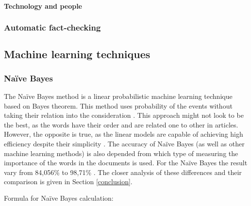 \documentclass[11pt ,english,a4paper]{article}
\begin{document}
\paragraph{Technology and people}%

\subsubsection{Automatic fact-checking}\label{tech:fact:auto}
\cite{gu22fact}

\subsection{Machine learning techniques} \label{tech:mach}



\subsubsection{Naïve Bayes}\label{nb}
The Naïve Bayes method is a linear probabilistic machine learning technique based on Bayes theorem. This method uses probability of the events without taking their relation into the consideration \cite{sha20mach}. This approach might not look to be the best, as the words have their order and are related one to other in articles. However, the opposite is true, as the linear models are capable of achieving high efficiency despite their simplicity \cite{pod19mach}. The accuracy of Naïve Bayes (as well as other machine learning methods) is also depended from which type of measuring the importance of the words in the documents is used. For the Naïve Bayes the result vary from 84,056\% \cite{sha20mach} to 98,71\% \cite{bar21health}. The closer analysis of these differences and their comparison is given in Section \ref{conclusion}.

Formula for Naïve Bayes calculation: \cite{sha20mach}
\end{document}

